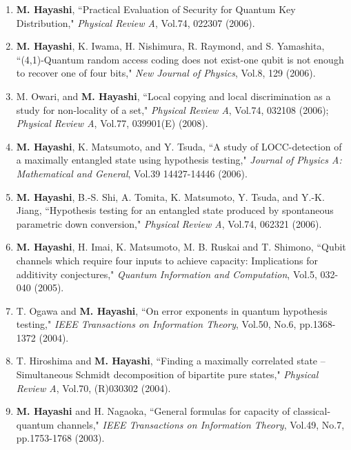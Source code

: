 \documentclass[a4paper,12pt,oneside]{article}
\begin{document}
\begin{enumerate}
\item
\textbf{M. Hayashi}, ``Practical Evaluation of Security for Quantum Key Distribution," 
{\em Physical Review A}, Vol.74, 022307 (2006).

\item
\textbf{M. Hayashi}, K. Iwama, H. Nishimura, R. Raymond, and S. Yamashita, 
``(4,1)-Quantum random access coding does not exist-one qubit is not enough to recover one of four bits," 
{\em New Journal of Physics}, Vol.8, 129 (2006).

\item
M. Owari, and \textbf{M. Hayashi}, 
``Local copying and local discrimination as a study for non-locality of a set," 
{\em Physical Review A}, Vol.74, 032108 (2006); 
{\em Physical Review A}, Vol.77, 039901(E) (2008).

\item
\textbf{M. Hayashi}, K. Matsumoto, and Y. Tsuda, 
``A study of LOCC-detection of a maximally entangled state using hypothesis testing," 
{\em Journal of Physics A: Mathematical and General}, Vol.39 14427-14446 (2006).

\item
\textbf{M. Hayashi}, B.-S. Shi, A. Tomita, K. Matsumoto, Y. Tsuda, and Y.-K. Jiang, 
``Hypothesis testing for an entangled state produced by spontaneous parametric down conversion," 
{\em Physical Review A}, Vol.74, 062321 (2006).

\item
\textbf{M. Hayashi}, H. Imai, K. Matsumoto, M. B. Ruskai and T. Shimono, 
``Qubit channels which require four inputs to achieve capacity: Implications for additivity conjectures," 
{\em Quantum Information and Computation}, Vol.5, 032-040 (2005).

\item
T. Ogawa and \textbf{M. Hayashi}, 
``On error exponents in quantum hypothesis testing," 
{\em IEEE Transactions on Information Theory}, Vol.50, No.6, pp.1368-1372 (2004).

\item
T. Hiroshima and \textbf{M. Hayashi}, ``Finding a maximally correlated state -- Simultaneous Schmidt decomposition of bipartite pure states," 
{\em Physical Review A}, Vol.70, (R)030302 (2004).

\item
\textbf{M. Hayashi} and H. Nagaoka, ``General formulas for capacity of classical-quantum channels," 
{\em IEEE Transactions on Information Theory}, Vol.49, No.7, pp.1753-1768 (2003).


\end{enumerate}
\end{document}
